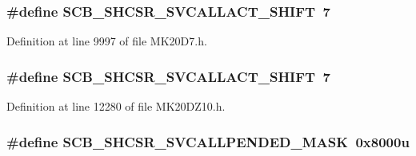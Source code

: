 \subsubsection[{\texorpdfstring{S\+C\+B\+\_\+\+S\+H\+C\+S\+R\+\_\+\+S\+V\+C\+A\+L\+L\+A\+C\+T\+\_\+\+S\+H\+I\+FT}{SCB_SHCSR_SVCALLACT_SHIFT}}]{\setlength{\rightskip}{0pt plus 5cm}\#define S\+C\+B\+\_\+\+S\+H\+C\+S\+R\+\_\+\+S\+V\+C\+A\+L\+L\+A\+C\+T\+\_\+\+S\+H\+I\+FT~7}\hypertarget{group___s_c_b___register___masks_gaba820858a54c18f1280a32238d14e5e0}{}\label{group___s_c_b___register___masks_gaba820858a54c18f1280a32238d14e5e0}


Definition at line 9997 of file M\+K20\+D7.\+h.

\subsubsection[{\texorpdfstring{S\+C\+B\+\_\+\+S\+H\+C\+S\+R\+\_\+\+S\+V\+C\+A\+L\+L\+A\+C\+T\+\_\+\+S\+H\+I\+FT}{SCB_SHCSR_SVCALLACT_SHIFT}}]{\setlength{\rightskip}{0pt plus 5cm}\#define S\+C\+B\+\_\+\+S\+H\+C\+S\+R\+\_\+\+S\+V\+C\+A\+L\+L\+A\+C\+T\+\_\+\+S\+H\+I\+FT~7}\hypertarget{group___s_c_b___register___masks_gaba820858a54c18f1280a32238d14e5e0}{}\label{group___s_c_b___register___masks_gaba820858a54c18f1280a32238d14e5e0}


Definition at line 12280 of file M\+K20\+D\+Z10.\+h.

\subsubsection[{\texorpdfstring{S\+C\+B\+\_\+\+S\+H\+C\+S\+R\+\_\+\+S\+V\+C\+A\+L\+L\+P\+E\+N\+D\+E\+D\+\_\+\+M\+A\+SK}{SCB_SHCSR_SVCALLPENDED_MASK}}]{\setlength{\rightskip}{0pt plus 5cm}\#define S\+C\+B\+\_\+\+S\+H\+C\+S\+R\+\_\+\+S\+V\+C\+A\+L\+L\+P\+E\+N\+D\+E\+D\+\_\+\+M\+A\+SK~0x8000u}\hypertarget{group___s_c_b___register___masks_gaa3091912694f50ac51a925d4d7bcf854}{}\label{group___s_c_b___register___masks_gaa3091912694f50ac51a925d4d7bcf854}


